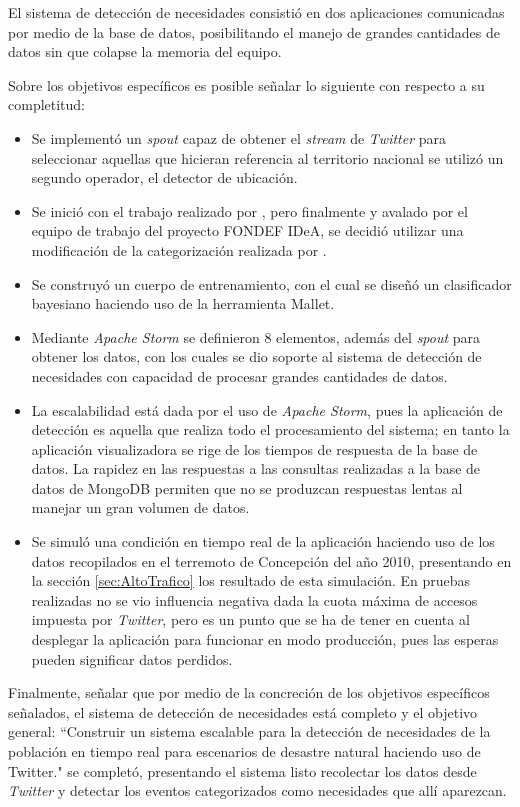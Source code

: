 El sistema de detección de necesidades consistió en dos aplicaciones comunicadas por medio de la base de datos, posibilitando el manejo de grandes cantidades de datos sin que colapse la memoria del equipo.

Sobre los objetivos específicos es posible señalar lo siguiente con respecto a su completitud:

\begin{itemize}
\item Se implementó un \textit{spout} capaz de obtener el \textit{stream} de \textit{Twitter} para seleccionar aquellas que hicieran referencia al territorio nacional se utilizó un segundo operador, el detector de ubicación.
\item Se inició con el trabajo realizado por \citep{TaxonomiaChato}, pero finalmente y avalado por el equipo de trabajo del proyecto FONDEF IDeA, se decidió utilizar una modificación de la categorización realizada por \citep{PMIProfes}.
\item Se construyó un cuerpo de entrenamiento, con el cual se diseñó un clasificador bayesiano haciendo uso de la herramienta Mallet.
\item Mediante \textit{Apache Storm} se definieron 8 elementos, además del \textit{spout} para obtener los datos, con los cuales se dio soporte al sistema de detección de necesidades con capacidad de procesar grandes cantidades de datos.
\item La escalabilidad está dada por el uso de \textit{Apache Storm}, pues la aplicación de detección es aquella que realiza todo el procesamiento del sistema; en tanto la aplicación visualizadora se rige de los tiempos de respuesta de la base de datos. La rapidez en las respuestas a las consultas realizadas a la base de datos de MongoDB permiten que no se produzcan respuestas lentas al manejar un gran volumen de datos.
\item Se simuló una condición en tiempo real de la aplicación haciendo uso de los datos recopilados en el terremoto de Concepción del año 2010, presentando en la sección \ref{sec:AltoTrafico} los resultado de esta simulación. En pruebas realizadas no se vio influencia negativa dada la cuota máxima de accesos impuesta por \textit{Twitter}, pero es un punto que se ha de tener en cuenta al desplegar la aplicación para funcionar en modo producción, pues las esperas pueden significar datos perdidos.
\end{itemize}

Finalmente, señalar que por medio de la concreción de los objetivos específicos señalados, el sistema de detección de necesidades está completo y el objetivo general: ``Construir un sistema escalable para la detección de necesidades de la población en tiempo real para escenarios de desastre natural haciendo uso de Twitter." se completó, presentando el sistema listo recolectar los datos desde \textit{Twitter} y detectar los eventos categorizados como necesidades que allí aparezcan.

